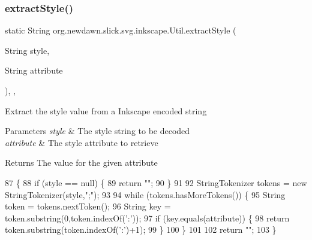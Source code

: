 \subsubsection{\texorpdfstring{extract\+Style()}{extractStyle()}}
{\footnotesize\ttfamily static String org.\+newdawn.\+slick.\+svg.\+inkscape.\+Util.\+extract\+Style (\begin{DoxyParamCaption}\item[{String}]{style,  }\item[{String}]{attribute }\end{DoxyParamCaption})\hspace{0.3cm}{\ttfamily [inline]}, {\ttfamily [static]}, {\ttfamily [package]}}

Extract the style value from a Inkscape encoded string


\begin{DoxyParams}{Parameters}
{\em style} & The style string to be decoded \\
\hline
{\em attribute} & The style attribute to retrieve \\
\hline
\end{DoxyParams}
\begin{DoxyReturn}{Returns}
The value for the given attribute 
\end{DoxyReturn}

\begin{DoxyCode}
87                                                                \{
88         \textcolor{keywordflow}{if} (style == null) \{
89             \textcolor{keywordflow}{return} \textcolor{stringliteral}{""};
90         \}
91         
92         StringTokenizer tokens = \textcolor{keyword}{new} StringTokenizer(style,\textcolor{stringliteral}{";"});
93         
94         \textcolor{keywordflow}{while} (tokens.hasMoreTokens()) \{
95             String token = tokens.nextToken();
96             String key = token.substring(0,token.indexOf(\textcolor{charliteral}{':'}));
97             \textcolor{keywordflow}{if} (key.equals(attribute)) \{
98                 \textcolor{keywordflow}{return} token.substring(token.indexOf(\textcolor{charliteral}{':'})+1);
99             \}
100         \}
101         
102         \textcolor{keywordflow}{return} \textcolor{stringliteral}{""};
103     \}
\end{DoxyCode}
\mbox{\label{classorg_1_1newdawn_1_1slick_1_1svg_1_1inkscape_1_1_util_a5c5c9cf51e4c8021b7eeac2714142a1f}} 
